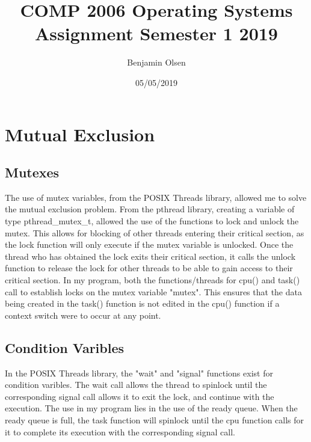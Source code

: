 \documentclass{article}
\title{COMP 2006 Operating Systems Assignment Semester 1 2019}
\date{05/05/2019}
\author{Benjamin Olsen}
\begin{document}
  \maketitle
  \newpage
  \doublespacing
  \tableofcontents
  \singlespacing
  \newpage

  \section{Mutual Exclusion}
    \subsection{Mutexes}
        The use of mutex variables, from the POSIX Threads library, allowed me to solve the mutual exclusion problem.
        From the pthread library, creating a variable of type pthread\_mutex\_t, allowed the use of the functions to lock and unlock the mutex.
        This allows for blocking of other threads entering their critical section, as the lock function will only execute if the mutex variable is unlocked.
        Once the thread who has obtained the lock exits their critical section, it calls the unlock function to release the lock for other threads to be able to gain access to their critical section.
        In my program, both the functions/threads for cpu() and task() call to establish locks on the mutex variable "mutex". This ensures that the data being created in the task() function is not edited in the cpu() function if a context switch were to occur at any point.
    \subsection{Condition Varibles}
      In the POSIX Threads library, the "wait" and "signal" functions exist for condition varibles. The wait call allows the thread to spinlock until the corresponding signal call allows it to exit the lock, and continue with the execution. The use in my program lies in the use of the ready queue. When the ready queue is full, the task function will spinlock until the cpu function calls for it to complete its execution with the corresponding signal call.
\end{document}
